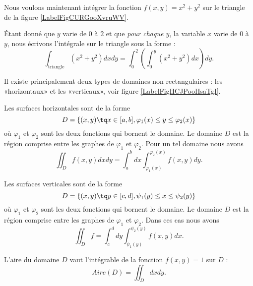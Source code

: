 Nous voulons maintenant intégrer la fonction $f(x,y)=x^2+y^2$ sur le triangle de la figure \ref{LabelFigCURGooXvruWV}. %
\newcommand{\CaptionFigCURGooXvruWV}{Intégration sur un triangle}


Étant donné que $y$ varie de $0$ à $2$ et que \emph{pour chaque $y$}, la variable $x$ varie de $0$ à $y$, nous écrivons l'intégrale sur le triangle sous la forme :
\begin{equation}
	\int_{\text{triangle}}(x^2+y^2)dx dy=\int_0^2\left( \int_0^y(x^2+y^2)dx \right)dy.
\end{equation}

Il existe principalement deux types de domaines non rectangulaires : les «horizontaux» et les «verticaux», voir figure \ref{LabelFigHCJPooHsaTgI}. %
\newcommand{\CaptionFigHCJPooHsaTgI}{Deux types de surfaces. Nous avons tracé un rectangle qui contient chacune des deux surfaces. L'intégrale sur un domaine sera l'intégrale sur le rectangle de la fonction qui vaut zéro en dehors du domaine.}


Les surfaces horizontales sont de la forme 
\begin{equation}
    D=\{ (x,y)\tq x\in\mathopen[ a , b \mathclose],\varphi_1(x)\leq y\leq \varphi_2(x) \}
\end{equation}
où $\varphi_1$ et $\varphi_2$ sont les deux fonctions qui bornent le domaine. Le domaine $D$ est la région comprise entre les graphes de $\varphi_1$ et $\varphi_2$. Pour un tel domaine nous avons
\begin{equation}
    \iint_Df(x,y)dxdy=\int_a^bdx\int_{\varphi_1(x)}^{\varphi_2(x)}f(x,y)dy.
\end{equation}

Les surfaces verticales sont de la forme 
\begin{equation}
    D=\{ (x,y)\tq y\in\mathopen[ c , d \mathclose],\psi_1(y)\leq x\leq \psi_2(y) \}
\end{equation}
où $\varphi_1$ et $\varphi_2$ sont les deux fonctions qui bornent le domaine. Le domaine $D$ est la région comprise entre les graphes de $\varphi_1$ et $\varphi_2$. Dans ces cas nous avons
\begin{equation}
    \iint_Df=\int_c^d dy\int_{\psi_1(y)}^{\psi_2(y)} f(x,y)dx.
\end{equation}

\begin{proposition}
    L'aire du domaine $D$ vaut l'intégrable de la fonction $f(x,y)=1$ sur $D$ :
    \begin{equation}
        Aire(D)=\iint_Ddxdy.
    \end{equation}
\end{proposition}

